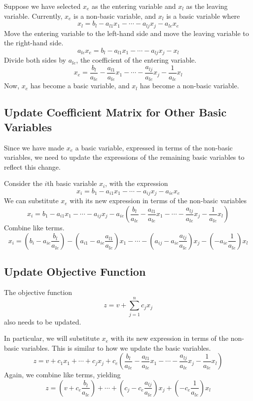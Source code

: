 Suppose we have selected $x_e$ as the entering variable and $x_l$ as the leaving variable. Currently, $x_e$ is a non-basic variable, and $x_l$ is a basic variable where
$$
x_l = b_l - a_{l1}x_1 - \cdots - a_{lj}x_j - a_{le}x_e
$$
Move the entering variable to the left-hand side and move the leaving variable to the right-hand side.
$$
a_{le}x_e = b_l - a_{l1}x_1 - \cdots - a_{lj}x_j - x_l
$$
Divide both sides by $a_{le}$, the coefficient of the entering variable.
$$
x_e = \frac{b_l}{a_{le}} - \frac{a_{l1}}{a_{le}}x_1 - \cdots - \frac{a_{lj}}{a_{le}}x_j - \frac{1}{a_{le}}x_l
$$
Now, $x_e$ has become a basic variable, and $x_l$ has become a non-basic variable.

\subsection{Update Coefficient Matrix for Other Basic Variables}

Since we have made $x_e$ a basic variable, expressed in terms of the non-basic variables, we need to update the expressions of the remaining basic variables to reflect this change.

Consider the $i$th basic variable $x_i$, with the expression
$$
x_i = b_1 - a_{i1}x_1 - \cdots - a_{ij}x_j - a_{ie}x_e
$$
We can substitute $x_e$ with its new expression in terms of the non-basic variables
$$
x_i = b_1 - a_{i1}x_1 - \cdots - a_{ij}x_j - a_{ie}\left( \frac{b_l}{a_{le}} - \frac{a_{l1}}{a_{le}}x_1 - \cdots - \frac{a_{lj}}{a_{le}}x_j - \frac{1}{a_{le}}x_l \right) 
$$
Combine like terms.
$$
x_i = \left( b_i - a_{ie}\frac{b_l}{a_{le}} \right) - \left( a_{i1}-a_{ie}\frac{a_{l1}}{a_{le}} \right) x_1 - \cdots - \left( a_{ij}-a_{ie}\frac{a_{lj}}{a_{le}} \right) x_j - \left( -a_{ie}\frac{1}{a_{le}} \right) x_l
$$

\subsection{Update Objective Function}

The objective function
$$
z = v + \sum_{j=1}^n c_j x_j
$$
also needs to be updated.

In particular, we will substitute $x_e$ with its new expression in terms of the non-basic variables. This is similar to how we update the basic variables.
$$
z = v + c_1x_1 + \cdots + c_j x_j + c_e \left( \frac{b_l}{a_{le}} - \frac{a_{l1}}{a_{le}}x_1 - \cdots - \frac{a_{lj}}{a_{le}}x_j - \frac{1}{a_{le}}x_l \right)
$$
Again, we combine like terms, yielding
$$
z = \left( v + c_e \frac{b_l}{a_{le}} \right) + \cdots + \left( c_j - c_e \frac{a_{lj}}{a_{le}} \right) x_j + \left( - c_e \frac{1}{a_{le}} \right)x_l
$$

